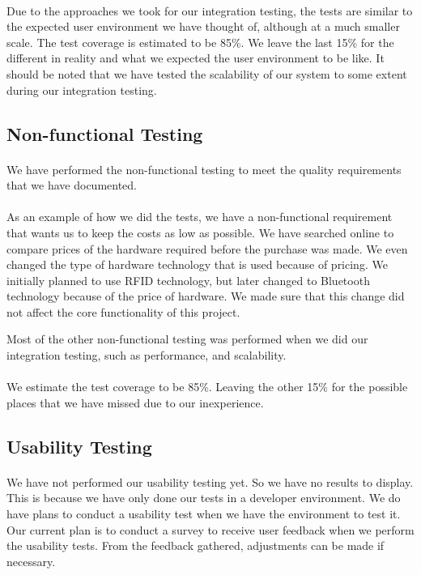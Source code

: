 \documentclass{article}
\begin{document}
\paragraph{}Due to the approaches we took for our integration testing, the tests are similar to the expected user environment we have thought of, although at a much smaller scale. The test coverage is estimated to be 85\%. We leave the last 15\% for the different in reality and what we expected the user environment to be like. It should be noted that we have tested the scalability of our system to some extent during our integration testing.

\subsection{Non-functional Testing}
\paragraph{}We have performed the non-functional testing to meet the quality requirements that we have documented. 

\paragraph{}As an example of how we did the tests, we have a non-functional requirement that wants us to keep the costs as low as possible. We have searched online to compare prices of the hardware required before the purchase was made. We even changed the type of hardware technology that is used because of pricing. We initially planned to use RFID technology, but later changed to Bluetooth technology because of the price of hardware. We made sure that this change did not affect the core functionality of this project.
\par{}Most of the other non-functional testing was performed when we did our integration testing, such as performance, and scalability.

\paragraph{}We estimate the test coverage to be 85\%. Leaving the other 15\% for the possible places that we have missed due to our inexperience.

\subsection{Usability Testing}
\paragraph{}We have not performed our usability testing yet. So we have no results to display. This is because we have only done our tests in a developer environment. We do have plans to conduct a usability test when we have the environment to test it. Our current plan is to conduct a survey to receive user feedback when we perform the usability tests. From the feedback gathered, adjustments can be made if necessary.
\end{document}

